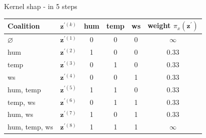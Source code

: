 \documentclass[11pt,compress,t,notes=noshow, aspectratio=169, xcolor=table]{beamer}
\begin{document}
\begin{frame}{Kernel shap - in 5 steps}
\begin{table}[]
    \centering
        \begin{tabular}{l |c|ccc|c}
 Coalition & $\mathbf{z}^{\prime (k)}$ &  hum & temp & ws & weight $\pi_{x}\left(\mathbf{z}^{\prime}\right)$\\
  \hline 
  $\varnothing$ & $\mathbf{z}^{\prime (1)}$ & 0 & 0 & 0 & $\infty$ \\
  hum & $\mathbf{z}^{\prime (2)}$ & 1 & 0 & 0 & 0.33 \\
  temp &  $\mathbf{z}^{\prime (3)}$ & 0 & 1 & 0 & 0.33 \\
  ws &   $\mathbf{z}^{\prime (4)}$ & 0 & 0 & 1 & 0.33  \\
  hum, temp & $\mathbf{z}^{\prime (5)}$ & 1 & 1 & 0 & 0.33 \\
  temp, ws & $\mathbf{z}^{\prime (6)}$ & 0 & 1 & 1 & 0.33 \\
  hum, ws &   $\mathbf{z}^{\prime (7)}$ & 1 & 0 & 1 & 0.33 \\
  hum, temp, ws & $\mathbf{z}^{\prime (8)}$ & 1 & 1 & 1 & $\infty$ \\
  
 
  \end{tabular}
\end{table}

  
\end{frame}





\end{document}
